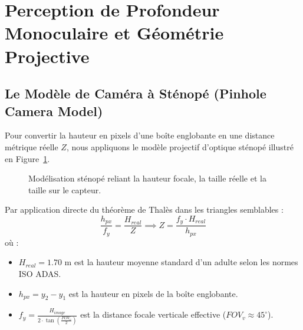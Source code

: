 \documentclass[11pt,a4paper]{article}
\begin{document}
\section{Perception de Profondeur Monoculaire et Géométrie Projective}

\subsection{Le Modèle de Caméra à Sténopé (Pinhole Camera Model)}
Pour convertir la hauteur en pixels d'une boîte englobante en une distance métrique réelle $Z$, nous appliquons le modèle projectif d'optique sténopé illustré en Figure~\ref{fig:pinhole}.

\begin{figure}[H]
\centering
{}
\caption{Modélisation sténopé reliant la hauteur focale, la taille réelle et la taille sur le capteur.}
\label{fig:pinhole}
\end{figure}

Par application directe du théorème de Thalès dans les triangles semblables :
\begin{equation}
    \frac{h_{px}}{f_y} = \frac{H_{real}}{Z} \implies Z = \frac{f_y \cdot H_{real}}{h_{px}}
\end{equation}
où :
\begin{itemize}
    \item $H_{real} = 1.70\text{ m}$ est la hauteur moyenne standard d'un adulte selon les normes ISO ADAS.
    \item $h_{px} = y_2 - y_1$ est la hauteur en pixels de la boîte englobante.
    \item $f_y = \frac{H_{image}}{2 \cdot \tan(\frac{FOV_v}{2})}$ est la distance focale verticale effective ($FOV_v \approx 45^\circ$).
\end{itemize}
\end{document}
